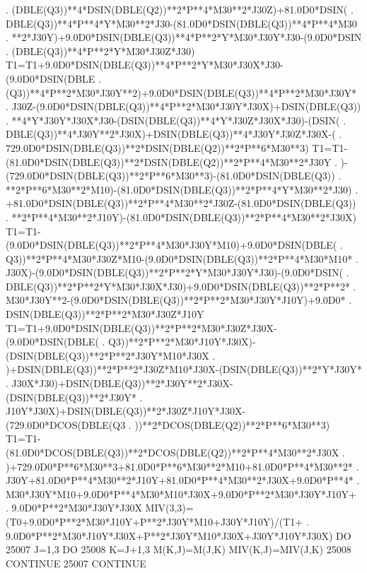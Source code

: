 \begin{framedverbatim}
     . (DBLE(Q3))**4*DSIN(DBLE(Q2))**2*P**4*M30**2*J30Z)+81.0D0*DSIN(
     . DBLE(Q3))**4*P**4*Y*M30**2*J30-(81.0D0*DSIN(DBLE(Q3))**4*P**4*M30
     . **2*J30Y)+9.0D0*DSIN(DBLE(Q3))**4*P**2*Y*M30*J30Y*J30-(9.0D0*DSIN
     . (DBLE(Q3))**4*P**2*Y*M30*J30Z*J30)
      T1=T1+9.0D0*DSIN(DBLE(Q3))**4*P**2*Y*M30*J30X*J30-(9.0D0*DSIN(DBLE
     . (Q3))**4*P**2*M30*J30Y**2)+9.0D0*DSIN(DBLE(Q3))**4*P**2*M30*J30Y*
     . J30Z-(9.0D0*DSIN(DBLE(Q3))**4*P**2*M30*J30Y*J30X)+DSIN(DBLE(Q3))
     . **4*Y*J30Y*J30X*J30-(DSIN(DBLE(Q3))**4*Y*J30Z*J30X*J30)-(DSIN(
     . DBLE(Q3))**4*J30Y**2*J30X)+DSIN(DBLE(Q3))**4*J30Y*J30Z*J30X-(
     . 729.0D0*DSIN(DBLE(Q3))**2*DSIN(DBLE(Q2))**2*P**6*M30**3)
      T1=T1-(81.0D0*DSIN(DBLE(Q3))**2*DSIN(DBLE(Q2))**2*P**4*M30**2*J30Y
     . )-(729.0D0*DSIN(DBLE(Q3))**2*P**6*M30**3)-(81.0D0*DSIN(DBLE(Q3))
     . **2*P**6*M30**2*M10)-(81.0D0*DSIN(DBLE(Q3))**2*P**4*Y*M30**2*J30)
     . +81.0D0*DSIN(DBLE(Q3))**2*P**4*M30**2*J30Z-(81.0D0*DSIN(DBLE(Q3))
     . **2*P**4*M30**2*J10Y)-(81.0D0*DSIN(DBLE(Q3))**2*P**4*M30**2*J30X)
      T1=T1-(9.0D0*DSIN(DBLE(Q3))**2*P**4*M30*J30Y*M10)+9.0D0*DSIN(DBLE(
     . Q3))**2*P**4*M30*J30Z*M10-(9.0D0*DSIN(DBLE(Q3))**2*P**4*M30*M10*
     . J30X)-(9.0D0*DSIN(DBLE(Q3))**2*P**2*Y*M30*J30Y*J30)-(9.0D0*DSIN(
     . DBLE(Q3))**2*P**2*Y*M30*J30X*J30)+9.0D0*DSIN(DBLE(Q3))**2*P**2*
     . M30*J30Y**2-(9.0D0*DSIN(DBLE(Q3))**2*P**2*M30*J30Y*J10Y)+9.0D0*
     . DSIN(DBLE(Q3))**2*P**2*M30*J30Z*J10Y
      T1=T1+9.0D0*DSIN(DBLE(Q3))**2*P**2*M30*J30Z*J30X-(9.0D0*DSIN(DBLE(
     . Q3))**2*P**2*M30*J10Y*J30X)-(DSIN(DBLE(Q3))**2*P**2*J30Y*M10*J30X
     . )+DSIN(DBLE(Q3))**2*P**2*J30Z*M10*J30X-(DSIN(DBLE(Q3))**2*Y*J30Y*
     . J30X*J30)+DSIN(DBLE(Q3))**2*J30Y**2*J30X-(DSIN(DBLE(Q3))**2*J30Y*
     . J10Y*J30X)+DSIN(DBLE(Q3))**2*J30Z*J10Y*J30X-(729.0D0*DCOS(DBLE(Q3
     . ))**2*DCOS(DBLE(Q2))**2*P**6*M30**3)
      T1=T1-(81.0D0*DCOS(DBLE(Q3))**2*DCOS(DBLE(Q2))**2*P**4*M30**2*J30X
     . )+729.0D0*P**6*M30**3+81.0D0*P**6*M30**2*M10+81.0D0*P**4*M30**2*
     . J30Y+81.0D0*P**4*M30**2*J10Y+81.0D0*P**4*M30**2*J30X+9.0D0*P**4*
     . M30*J30Y*M10+9.0D0*P**4*M30*M10*J30X+9.0D0*P**2*M30*J30Y*J10Y+
     . 9.0D0*P**2*M30*J30Y*J30X
      MIV(3,3)=(T0+9.0D0*P**2*M30*J10Y+P**2*J30Y*M10+J30Y*J10Y)/(T1+
     . 9.0D0*P**2*M30*J10Y*J30X+P**2*J30Y*M10*J30X+J30Y*J10Y*J30X)
      DO 25007 J=1,3
          DO 25008 K=J+1,3
              M(K,J)=M(J,K)
              MIV(K,J)=MIV(J,K)
25008     CONTINUE
25007 CONTINUE
\end{framedverbatim}


